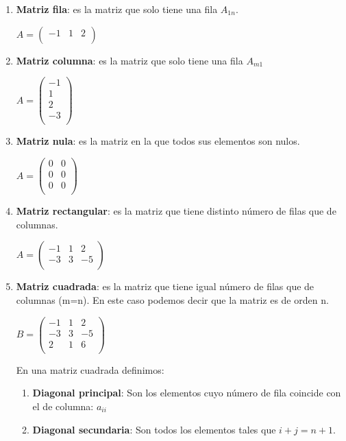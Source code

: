 \begin{enumerate}[label={\alph* )}]
	\item  {\bf Matriz fila}: es la matriz que solo tiene una fila $A_{1n}$.
 
  		$A= \begin{pmatrix}  -1 & 1  & 2  \\ \end{pmatrix}$
  
    \item  {\bf Matriz columna}: es la matriz que solo tiene una fila $A_{m1}$
   
  		$A= \begin{pmatrix}  -1 \\  1  \\  2  \\  -3   \\\end{pmatrix}$

  
   \item  {\bf Matriz nula}: es la matriz en la que todos sus elementos son nulos.
 
  $A= \begin{pmatrix}  0 & 0  \\  0  & 0 \\   0 & 0 \\\end{pmatrix}$

 	\item  {\bf Matriz rectangular}: es la matriz que tiene distinto número de filas que de columnas.
 
  		$A= \begin{pmatrix}  -1 & 1  & 2  \\  -3  & 3 & -5 \\\end{pmatrix}$

	\item {\bf Matriz cuadrada}: es la matriz que tiene igual número de filas que de columnas (m=n). En este caso podemos decir que la matriz es de orden n. 

  	$B= \begin{pmatrix}  -1 & 1  & 2  \\  -3  & 3 & -5 \\  2  & 1 & 6 \\\end{pmatrix}$


  	En una matriz cuadrada definimos:
  \begin{enumerate}[label={\roman* )}]
  \item {\bf Diagonal principal}: Son los elementos cuyo número de fila coincide con el de columna: $a_{ii}$
  \item {\bf Diagonal secundaria}: Son todos los elementos tales que $i+j=n+1$.
  \end{enumerate}
  
\end{enumerate}

